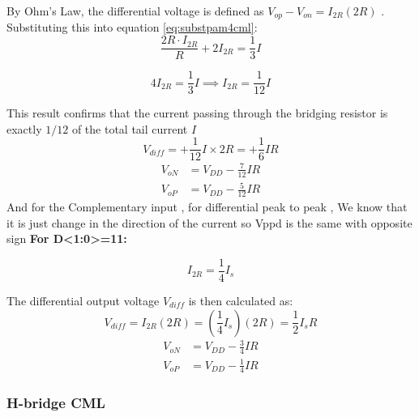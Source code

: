 By Ohm's Law, the differential voltage is defined as $V_{op} - V_{on} = I_{2R}(2R)$ . Substituting this into equation \eqref{eq:substpam4cml}:
\begin{equation}
    \frac{2R \cdot I_{2R}}{R} + 2I_{2R} = \frac{1}{3}I
\end{equation}

\begin{equation}
    4I_{2R} = \frac{1}{3}I \implies I_{2R} = \frac{1}{12}I
\end{equation}

This result confirms that the current passing through the bridging resistor is exactly $1/12$ of the total tail current $I$ 
\begin{equation}
    V_{diff} = +\frac{1}{12}I \times 2R = +\frac{1}{6}IR 
     \label{eq:vout_final}
\end{equation}
\begin{align}
    V_{oN} &= V_{DD} - \frac{7}{12} IR \\
    V_{oP} &= V_{DD} - \frac{5}{12} IR
\end{align}
And for the Complementary input , for differential peak to peak , We know that it is just change in the direction of the current so Vppd is the same with opposite sign
\noindent \textbf{For D<1:0>=11:} 


\begin{equation}
    I_{2R} = \frac{1}{4}I_s
\end{equation}

The differential output voltage $V_{diff}$ is then calculated as:
\begin{equation}
    V_{diff} = I_{2R}(2R) = \left( \frac{1}{4}I_s \right)(2R) = \frac{1}{2}I_sR
\end{equation}
\begin{align}
    V_{oN} &= V_{DD} - \frac{3}{4} IR \\
    V_{oP} &= V_{DD} - \frac{1}{4} IR
\end{align}
\newpage
\subsubsection{H-bridge CML} \label{ssubsec:H_CML}

